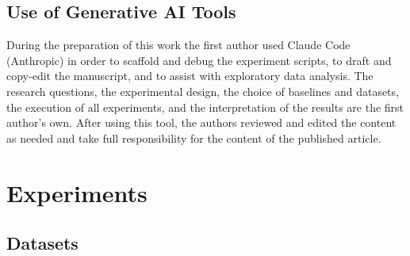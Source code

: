 \documentclass[pdflatex,sn-basic,Numbered]{sn-jnl}
\begin{document}
\subsection{Use of Generative AI Tools}
\label{sec:method:genai}
During the preparation of this work the first author used Claude Code (Anthropic) in order to scaffold and debug the experiment scripts, to draft and copy-edit the manuscript, and to assist with exploratory data analysis.
The research questions, the experimental design, the choice of baselines and datasets, the execution of all experiments, and the interpretation of the results are the first author's own.
After using this tool, the authors reviewed and edited the content as needed and take full responsibility for the content of the published article.

\section{Experiments}
\label{sec:experiments}

\subsection{Datasets}
\label{sec:exp:datasets}
\end{document}
